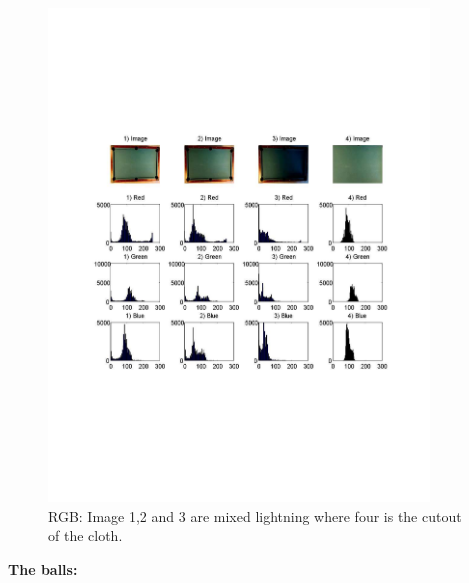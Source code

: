 \begin{figure}[H]
\begin{center}
\leavevmode
\includegraphics[width=0.9\textwidth]{images/table_hist_rgb.pdf}
\end{center}
\caption{RGB: Image 1,2 and 3 are mixed lightning where four is the cutout of the cloth.}
\label{fig:tablergb}
\end{figure}




\textbf{The balls:}\\